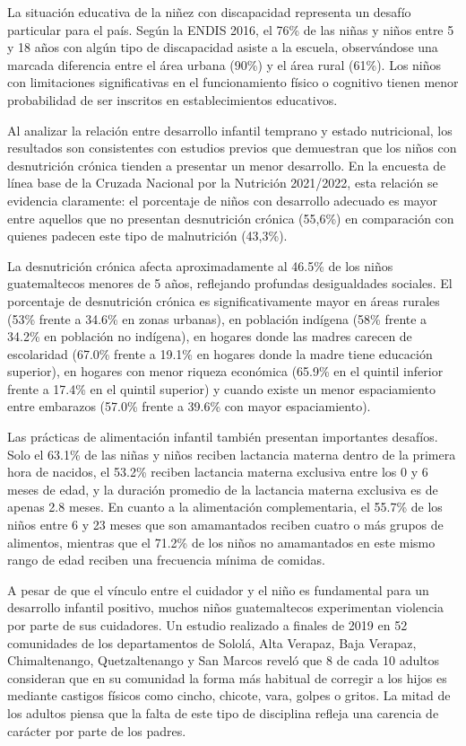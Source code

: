 \documentclass[11pt,letterpaper]{report}
\begin{document}
La situación educativa de la niñez con discapacidad representa un desafío
particular para el país. Según la ENDIS 2016, el 76\% de las niñas y niños
entre 5 y 18 años con algún tipo de discapacidad asiste a la escuela,
observándose una marcada diferencia entre el área urbana (90\%) y el área rural
(61\%). Los niños con limitaciones significativas en el funcionamiento físico o
cognitivo tienen menor probabilidad de ser inscritos en establecimientos
educativos. \cite{PoliticaInfanciaGuate}

Al analizar la relación entre desarrollo infantil temprano y estado
nutricional, los resultados son consistentes con estudios previos que
demuestran que los niños con desnutrición crónica tienden a presentar un menor
desarrollo. En la encuesta de línea base de la Cruzada Nacional por la
Nutrición 2021/2022, esta relación se evidencia claramente: el porcentaje de
niños con desarrollo adecuado es mayor entre aquellos que no presentan
desnutrición crónica (55,6\%) en comparación con quienes padecen este tipo de
malnutrición (43,3\%). \cite{SESAN2022}

La desnutrición crónica afecta aproximadamente al 46.5\% de los niños
guatemaltecos menores de 5 años, reflejando profundas desigualdades sociales.
El porcentaje de desnutrición crónica es significativamente mayor en áreas
rurales (53\% frente a 34.6\% en zonas urbanas), en población indígena (58\%
frente a 34.2\% en población no indígena), en hogares donde las madres carecen
de escolaridad (67.0\% frente a 19.1\% en hogares donde la madre tiene
educación superior), en hogares con menor riqueza económica (65.9\% en el
quintil inferior frente a 17.4\% en el quintil superior) y cuando existe un
menor espaciamiento entre embarazos (57.0\% frente a 39.6\% con mayor
espaciamiento). \cite{EnMaternoInfantil}

Las prácticas de alimentación infantil también presentan importantes desafíos.
Solo el 63.1\% de las niñas y niños reciben lactancia materna dentro de la
primera hora de nacidos, el 53.2\% reciben lactancia materna exclusiva entre
los 0 y 6 meses de edad, y la duración promedio de la lactancia materna
exclusiva es de apenas 2.8 meses. En cuanto a la alimentación complementaria,
el 55.7\% de los niños entre 6 y 23 meses que son amamantados reciben cuatro o
más grupos de alimentos, mientras que el 71.2\% de los niños no amamantados en
este mismo rango de edad reciben una frecuencia mínima de comidas.
\cite{EnMaternoInfantil} \cite{PoliticaInfanciaGuate}

A pesar de que el vínculo entre el cuidador y el niño es fundamental para un
desarrollo infantil positivo, muchos niños guatemaltecos experimentan violencia
por parte de sus cuidadores. Un estudio realizado a finales de 2019 en 52
comunidades de los departamentos de Sololá, Alta Verapaz, Baja Verapaz,
Chimaltenango, Quetzaltenango y San Marcos reveló que 8 de cada 10 adultos
consideran que en su comunidad la forma más habitual de corregir a los hijos es
mediante castigos físicos como cincho, chicote, vara, golpes o gritos. La mitad
de los adultos piensa que la falta de este tipo de disciplina refleja una
carencia de carácter por parte de los padres. \cite{PoliticaInfanciaGuate}
\cite{UNICEFComportamientosNinez}
\end{document}
